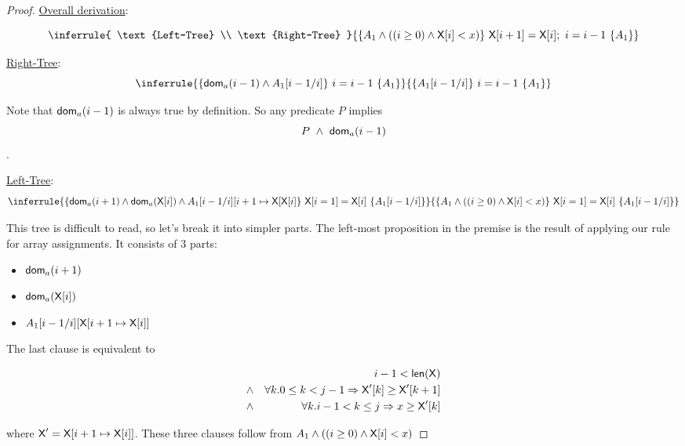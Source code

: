 \begin{enumerate}[(a)]
\begin{enumerate}[i.]
\begin{proof}
        \newcommand{\rightPremise}{
            \{ \dom_a(i - 1) \wedge A_1[i - 1/ i] \}
            ~i = i - 1~
            \{ A_1 \}
        }

        \newcommand{\rightBase}{
            \{ A_1[i - 1/ i] \}
            ~i = i - 1~
            \{ A_1 \}
        }
        \newcommand{\treeBase}{
            \{ A_1 \wedge ((i \geq 0) \wedge {\sf X}[i] < x) \}
            ~\X[i + 1] = \X[i];~i = i - 1~
            \{ A_1 \}
        }

        \underline{Overall derivation}:

        $$ \inferrule{
                \text{Left-Tree}
                \\
                \text{Right-Tree}
            }{\treeBase}
        $$

        \underline{Right-Tree}: \\
        $$ \inferrule{\rightPremise}{\rightBase} $$

        Note that ${\sf dom}_a(i - 1)$ is always true by definition. So any predicate
        $P$ implies $$P~\wedge~{\sf dom}_a(i - 1)$$.

        \underline{Left-Tree}:  \\
        $$ \inferrule{\leftPremise}{\leftBase} $$

        This tree is difficult to read, so let's break it into simpler parts.
        The left-most proposition in the premise is the result of applying
        our rule for array assignments. It consists of 3 parts:

        \begin{itemize}
        \item ${\sf dom}_a(i + 1)$
        \item ${\sf dom}_a({\sf X}[i])$
        \item $A_1[i - 1 / i][\textsf{X}[i + 1 \mapsto \textsf{X}[i]]$
        \end{itemize}

        The last clause is equivalent to

        \begin{eqnarray*}
        & & i - 1 < {\sf len(X)} \\
        & \wedge & \forall k. 0 \leq k < j - 1 \Rightarrow \textsf{X}'[k] \geq \textsf{X}'[k + 1] \\
        & \wedge & \forall k . i - 1 < k \leq j \Rightarrow  x \geq \textsf{X}'[k] \\
        \end{eqnarray*}

        where $\textsf{X}' = \textsf{X}[i + 1 \mapsto \textsf{X}[i]]$. These three clauses follow from
        $ A_1 \wedge ((i \geq 0) \wedge {\sf X}[i] < x) $


\end{proof}
\end{enumerate}
\end{enumerate}
